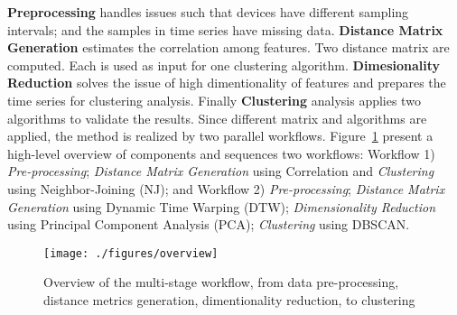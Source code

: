 \textbf{Preprocessing} handles issues such that devices have different sampling intervals; and the samples in time series have missing data. \textbf{Distance Matrix Generation} estimates the correlation among features. Two distance matrix are computed. Each is used as input for one clustering algorithm.  \textbf{Dimesionality Reduction} solves the issue of high dimentionality of features and prepares the time series for clustering analysis. Finally \textbf{Clustering} analysis applies two algorithms to validate the results. Since different matrix and algorithms are applied, the method is realized by two parallel workflows. Figure~\ref{Fig:overview} present a high-level overview of components and sequences two workflows: Workflow 1) \textit{Pre-processing}; \textit{Distance Matrix Generation} using Correlation and \textit{Clustering} using Neighbor-Joining (NJ); and Workflow 2) \textit{Pre-processing}; \textit{Distance Matrix Generation} using Dynamic Time Warping (DTW); \textit{Dimensionality Reduction} using Principal Component Analysis (PCA); \textit{Clustering} using DBSCAN. 


\begin{figure}
	\begin{center}
	\texttt{[image: ./figures/overview]}
	\caption{Overview of the multi-stage workflow, from data pre-processing, distance metrics generation, dimentionality reduction, to clustering}
	\label{Fig:overview}
	\end{center}
\end{figure}
